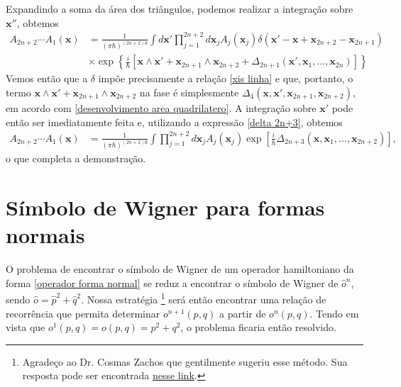 \documentclass[
	12pt,
	oneside,			%
	a4paper,			%
	english,			%
	brazil				%
	]{abntex2}
\theoremstyle{definition}
\begin{document}
\begin{apendicesenv}
Expandindo a soma da área dos triângulos, podemos realizar a integração sobre $\mathbf{x}''$, obtemos
\begin{equation}
    \begin{aligned}
        A_{2n+2} \cdots A_1 \left(\mathbf{x}\right) &= \frac{1}{\left(\pi \hbar\right)^{(2n+2)d}} \int  d\mathbf{x}' \prod_{j=1}^{2n+2} d\mathbf{x}_j A_j\left(\mathbf{x}_{j}\right) \delta\left( \mathbf{x}' - \mathbf{x} + \mathbf{x}_{2n+2} - \mathbf{x}_{2n+1} \right) \\& \times \exp\left\{\frac{i}{\hbar}\left[\mathbf{x} \wedge \mathbf{x}' + \mathbf{x}_{2n+1} \wedge \mathbf{x}_{2n+2} +\Delta_{2n+1} \left(\mathbf{x}',\mathbf{x}_1,\ldots,\mathbf{x}_{2n}\right)\right]\right\}
    \end{aligned}
\end{equation}
Vemos então que a $\delta$ impõe precisamente a relação \eqref{xis linha} e que, portanto, o termo $\mathbf{x} \wedge \mathbf{x}' + \mathbf{x}_{2n+1} \wedge \mathbf{x}_{2n+2}$ na fase é simplesmente $\Delta_4\left( \mathbf{x},\mathbf{x}',\mathbf{x}_{2n+1}, \mathbf{x}_{2n+2}\right)$, em acordo com \eqref{desenvolvimento area quadrilatero}. A integração sobre $\mathbf{x}'$ pode então ser imediatamente feita e, utilizando a expressão \eqref{delta 2n+3}, obtemos
\begin{equation}
    \begin{aligned}
        A_{2n+2} \cdots A_1 \left(\mathbf{x}\right) &= \frac{1}{\left(\pi \hbar\right)^{(2n+2)d}} \int  \prod_{j=1}^{2n+2} d\mathbf{x}_j A_j\left(\mathbf{x}_{j}\right) \exp\left[\frac{i}{\hbar}\Delta_{2n+3} \left(\mathbf{x},\mathbf{x}_1,\ldots,\mathbf{x}_{2n+2}\right)\right],
    \end{aligned}
\end{equation}
o que completa a demonstração.

\chapter{Símbolo de Wigner para formas normais}
\label{Símbolo de Wigner para formas normais}

O problema de encontrar o símbolo de Wigner de um operador hamiltoniano da forma \eqref{operador forma normal} se reduz a encontrar o símbolo de Wigner de $\hat{o}^n$, sendo $\hat{o} = \hat{p}^2+\hat{q}^2$. Nossa estratégia \footnote{Agradeço ao Dr. Cosmas Zachos que gentilmente sugeriu esse método. Sua resposta pode ser encontrada \href{https://physics.stackexchange.com/questions/689588/what-is-the-wigner-representation-of-left-hatx2-hatp2-rightn}{nesse link}.} será então encontrar uma relação de recorrência que permita determinar $o^{n+1}(p,q)$ a partir de $o^n(p,q)$. Tendo em vista que $o^1(p,q) = o(p,q) = p^2+q^2$, o problema ficaria então resolvido.


\end{apendicesenv}
\end{document}
